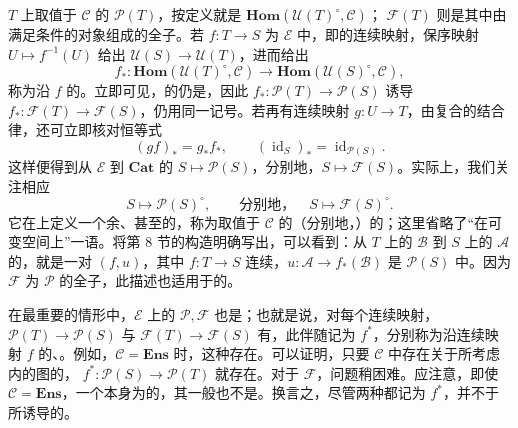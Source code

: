 $T$ 上取值于 $\mathcal C$ 的 $\mathcal P(T)$，按定义就是 $\mathbf{Hom}(\mathcal U(T)^\circ,\mathcal C)$； $\mathcal F(T)$ 则是其中由满足条件的对象组成的全子。若 $f:T\to S$ 为 $\mathcal E$ 中，即的连续映射，保序映射 $U\mapsto f^{-1}(U)$ 给出 $\mathcal U(S)\to\mathcal U(T)$，进而给出
\[
 f_*:\mathbf{Hom}(\mathcal U(T)^\circ,\mathcal C)\longrightarrow
 \mathbf{Hom}(\mathcal U(S)^\circ,\mathcal C),
\]
称为沿 $f$ 的。立即可见，的仍是，因此 $f_*:\mathcal P(T)\to\mathcal P(S)$ 诱导 $f_*:\mathcal F(T)\to\mathcal F(S)$，仍用同一记号。若再有连续映射 $g:U\to T$，由复合的结合律，还可立即核对恒等式
\[
 (gf)_*=g_*f_*,\qquad (\operatorname{id}_S)_*=\operatorname{id}_{\mathcal P(S)}.
\]
这样便得到从 $\mathcal E$ 到 $\mathbf{Cat}$ 的 $S\mapsto\mathcal P(S)$，分别地，$S\mapsto\mathcal F(S)$。实际上，我们关注相应
\[
 S\longmapsto\mathcal P(S)^\circ,\qquad\text{分别地，}\quad
 S\longmapsto\mathcal F(S)^\circ.
\]
它在上定义一个余、甚至的，称为取值于 $\mathcal C$ 的（分别地，）的；这里省略了“在可变空间上”一语。将第 8 节的构造明确写出，可以看到：从 $T$ 上的 $\mathcal B$ 到 $S$ 上的 $\mathcal A$ 的，就是一对 $(f,u)$，其中 $f:T\to S$ 连续，$u:\mathcal A\to f_*(\mathcal B)$ 是 $\mathcal P(S)$ 中。因为 $\mathcal F$ 为 $\mathcal P$ 的全子，此描述也适用于的。

在最重要的情形中，$\mathcal E$ 上的 $\mathcal P,\mathcal F$ 也是；也就是说，对每个连续映射， $\mathcal P(T)\to\mathcal P(S)$ 与 $\mathcal F(T)\to\mathcal F(S)$ 有，此伴随记为 $f^*$，分别称为沿连续映射 $f$ 的、。例如，$\mathcal C=\mathbf{Ens}$ 时，这种存在。可以证明，只要 $\mathcal C$ 中存在关于所考虑内的图的， $f^*:\mathcal P(S)\to\mathcal P(T)$ 就存在。对于 $\mathcal F$，问题稍困难。应注意，即使 $\mathcal C=\mathbf{Ens}$，一个本身为的，其一般也不是。换言之，尽管两种都记为 $f^*$，并不于所诱导的。

